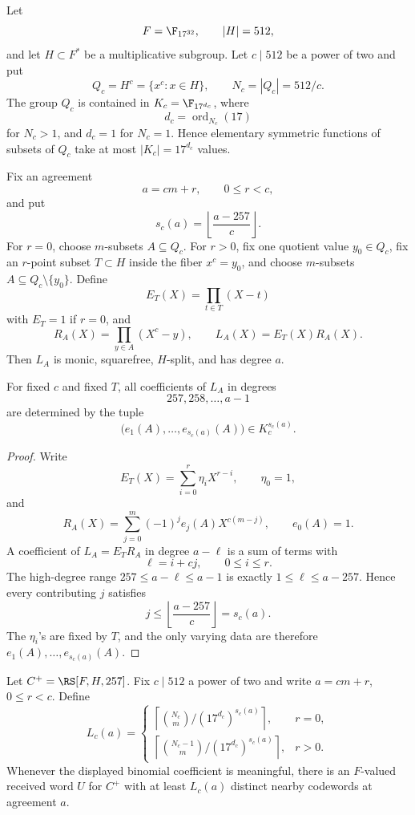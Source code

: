 Let
\[
  F=\F_{17^{32}},\qquad |H|=512,
\]
and let \(H\subset F^*\) be a multiplicative subgroup.  Let \(c\mid512\) be a
power of two and put
\[
  Q_c=H^c=\{x^c:x\in H\},
  \qquad N_c=|Q_c|=512/c.
\]
The group \(Q_c\) is contained in \(K_c=\F_{17^{d_c}}\), where
\[
  d_c=\operatorname{ord}_{N_c}(17)
\]
for \(N_c>1\), and \(d_c=1\) for \(N_c=1\).  Hence elementary symmetric
functions of subsets of \(Q_c\) take at most \(|K_c|=17^{d_c}\) values.

Fix an agreement
\[
  a=cm+r,
  \qquad 0\le r<c,
\]
and put
\[
  s_c(a)=\left\lfloor\frac{a-257}{c}\right\rfloor .
\]
For \(r=0\), choose \(m\)-subsets \(A\subseteq Q_c\).  For \(r>0\), fix one
quotient value \(y_0\in Q_c\), fix an \(r\)-point subset \(T\subset H\) inside
the fiber \(x^c=y_0\), and choose \(m\)-subsets
\(A\subseteq Q_c\setminus\{y_0\}\).  Define
\[
  E_T(X)=\prod_{t\in T}(X-t)
\]
with \(E_T=1\) if \(r=0\), and
\[
  R_A(X)=\prod_{y\in A}(X^c-y),
  \qquad
  L_A(X)=E_T(X)R_A(X).
\]
Then \(L_A\) is monic, squarefree, \(H\)-split, and has degree \(a\).

\begin{lemma}
\label{lem:dyadic-prefix-top-coeffs}
For fixed \(c\) and fixed \(T\), all coefficients of \(L_A\) in degrees
\[
  257,258,\ldots,a-1
\]
are determined by the tuple
\[
  \bigl(e_1(A),\ldots,e_{s_c(a)}(A)\bigr)
  \in K_c^{s_c(a)}.
\]
\end{lemma}

\begin{proof}
Write
\[
  E_T(X)=\sum_{i=0}^r \eta_iX^{r-i},\qquad \eta_0=1,
\]
and
\[
  R_A(X)=\sum_{j=0}^m (-1)^je_j(A)X^{c(m-j)},
  \qquad e_0(A)=1.
\]
A coefficient of \(L_A=E_TR_A\) in degree \(a-\ell\) is a sum of terms with
\[
  \ell=i+cj,
  \qquad 0\le i\le r.
\]
The high-degree range \(257\le a-\ell\le a-1\) is exactly
\(1\le\ell\le a-257\).  Hence every contributing \(j\) satisfies
\[
  j\le \left\lfloor\frac{a-257}{c}\right\rfloor=s_c(a).
\]
The \(\eta_i\)'s are fixed by \(T\), and the only varying data are therefore
\(e_1(A),\ldots,e_{s_c(a)}(A)\).
\end{proof}

\begin{proposition}
\label{prop:dyadic-augmented-list-floor}
Let \(C^+=\RS[F,H,257]\).  Fix \(c\mid512\) a power of two and write
\(a=cm+r\), \(0\le r<c\).  Define
\[
  L_c(a)=
  \begin{cases}
  \left\lceil\displaystyle {\binom{N_c}{m}}/{(17^{d_c})^{s_c(a)}}\right\rceil,
    & r=0,\\[1.2em]
  \left\lceil\displaystyle {\binom{N_c-1}{m}}/{(17^{d_c})^{s_c(a)}}\right\rceil,
    & r>0.
  \end{cases}
\]
Whenever the displayed binomial coefficient is meaningful, there is an
\(F\)-valued received word \(U\) for \(C^+\) with at least \(L_c(a)\) distinct
nearby codewords at agreement \(a\).
\end{proposition}

